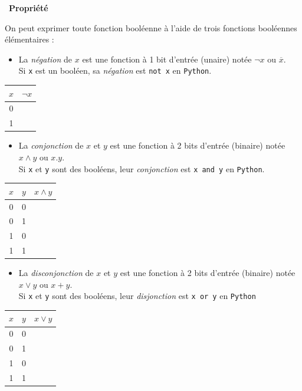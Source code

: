 \documentclass[
  11pt,
]{article}
\newcommand{\passthrough}[1]{#1}
\providecommand{\tightlist}{%
  \setlength{\itemsep}{0pt}\setlength{\parskip}{0pt}}
\newcounter{prop}
\newenvironment{propriete}[1]
{\par \medskip   \addtocounter{prop}{1} \noindent  
\begin{bclogo}[arrondi =0.1,  ombre = true, barre=none, logo=\bcbook, marge=4]{~\textbf{Propriété} \textbf{\theprop} {\itshape #1} }   \par}
{
\end{bclogo}
 \par \bigskip }
\begin{document}
\begin{propriete}{}

On peut exprimer toute fonction booléenne à l'aide de trois fonctions
booléennes élémentaires :

\begin{itemize}
\tightlist
\item
  La \emph{négation} de \(x\) est une fonction à 1 bit d'entrée (unaire)
  notée \(\neg x\) ou \(\overline{x}\).\\
  Si \passthrough{\lstinline!x!} est un booléen, sa \emph{négation} est
  \passthrough{\lstinline!not x!} en \passthrough{\lstinline!Python!}.
\end{itemize}

\begin{longtable}[]{@{}cl@{}}
\toprule
\(x\) & \(\neg x\)\tabularnewline
\midrule
\endhead
0 &\tabularnewline
1 &\tabularnewline
\bottomrule
\end{longtable}

\begin{itemize}
\tightlist
\item
  La \emph{conjonction} de \(x\) et \(y\) est une fonction à 2 bits
  d'entrée (binaire) notée \(x \wedge y\) ou \(x . y\).\\
  Si \passthrough{\lstinline!x!} et \passthrough{\lstinline!y!} sont des
  booléens, leur \emph{conjonction} est
  \passthrough{\lstinline!x and y!} en \passthrough{\lstinline!Python!}.
\end{itemize}

\begin{longtable}[]{@{}cll@{}}
\toprule
\(x\) & \(y\) & \(x \wedge y\)\tabularnewline
\midrule
\endhead
0 & 0 &\tabularnewline
0 & 1 &\tabularnewline
1 & 0 &\tabularnewline
1 & 1 &\tabularnewline
\bottomrule
\end{longtable}

\begin{itemize}
\tightlist
\item
  La \emph{disconjonction} de \(x\) et \(y\) est une fonction à 2 bits
  d'entrée (binaire) notée \(x \vee y\) ou \(x + y\).\\
  Si \passthrough{\lstinline!x!} et \passthrough{\lstinline!y!} sont des
  booléens, leur \emph{disjonction} est \passthrough{\lstinline!x or y!}
  en \passthrough{\lstinline!Python!}
\end{itemize}

\begin{longtable}[]{@{}cll@{}}
\toprule
\(x\) & \(y\) & \(x \vee y\)\tabularnewline
\midrule
\endhead
0 & 0 &\tabularnewline
0 & 1 &\tabularnewline
1 & 0 &\tabularnewline
1 & 1 &\tabularnewline
\bottomrule
\end{longtable}

\end{propriete}
\end{document}
